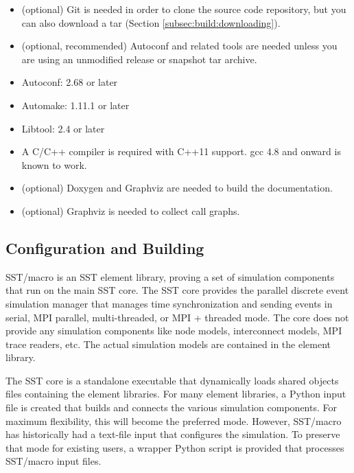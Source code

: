 \begin{itemize}
\item (optional) Git is needed in order to clone the source code repository, but you can also download a tar (Section \ref{subsec:build:downloading}).
\item (optional, recommended) Autoconf and related tools are needed unless you are using an unmodified release or snapshot tar archive.
\item Autoconf: 2.68 or later 
\item Automake: 1.11.1 or later 
\item Libtool: 2.4 or later 
\item A C/C++ compiler is required with C++11 support.  gcc 4.8 and onward is known to work. 
\item (optional) Doxygen and Graphviz are needed to build the documentation.
\item (optional) Graphviz is needed to collect call graphs.
\end{itemize}

\subsection{Configuration and Building}
\label{subsec:build:configure}

SST/macro is an SST element library, proving a set of simulation components that run on the main SST core.  The SST core provides the parallel discrete event simulation manager that manages time synchronization and sending events in serial, MPI parallel, multi-threaded, or MPI + threaded mode.  The core does not provide any simulation components like node models, interconnect models, MPI trace readers, etc.  The actual simulation models are contained in the element library.  

The SST core is a standalone executable that dynamically loads shared objects files containing the element libraries.  For many element libraries, a Python input file is created that builds and connects the various simulation components.  For maximum flexibility, this will become the preferred mode.  However, SST/macro has historically had a text-file input  that configures the simulation.  To preserve that mode for existing users, a wrapper Python script is provided that processes SST/macro input files.  


